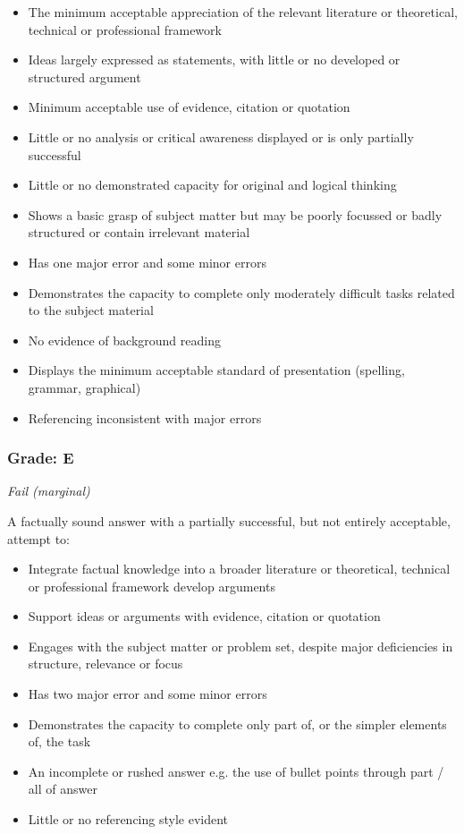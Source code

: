 \begin{itemize}
	\item The minimum acceptable appreciation of the relevant literature or theoretical, technical or professional framework
	\item Ideas largely expressed as statements, with little or no developed or structured argument
	\item Minimum acceptable use of evidence, citation or quotation
	\item Little or no analysis or critical awareness displayed or is only partially successful
	\item Little or no demonstrated capacity for original and logical thinking
	\item Shows a basic grasp of subject matter but may be poorly focussed or badly structured or contain irrelevant material
	\item Has one major error and some minor errors
	\item Demonstrates the capacity to
	complete only moderately difficult tasks related to the subject material
	\item No evidence of background reading
	\item Displays the minimum acceptable standard of presentation (spelling, grammar, graphical)
	\item Referencing inconsistent with major errors
\end{itemize}


\subsubsection*{Grade: E}

\textit{Fail (marginal)}

A factually sound answer with a partially successful, but not entirely acceptable, attempt to:

\begin{itemize}
	\item Integrate factual knowledge into a broader literature or theoretical, technical or professional framework develop arguments
	\item Support ideas or arguments with evidence, citation or quotation
	\item Engages with the subject matter or
	problem set, despite major
	deficiencies in structure, relevance or focus
	\item Has two major error and some minor
	errors
	\item Demonstrates the capacity to
	complete only part of, or the simpler
	elements of, the task
	\item An incomplete or rushed answer e.g.
	the use of bullet points through part /
	all of answer
	\item Little or no referencing style evident
\end{itemize}

